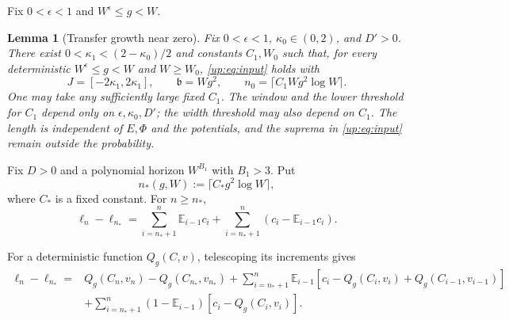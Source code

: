 \documentclass[11pt]{article}
\numberwithin{equation}{section}
\newtheorem{lemma}[theorem]{Lemma}
\theoremstyle{remark}
\newcommand{\E}{\mathbb E}
\begin{document}
Fix $0<\epsilon<1$ and $W^\epsilon\le g<W$.

\begin{lemma}[Transfer growth near zero]\label{up:lem:center-transfer}
Fix $0<\epsilon<1$, $\kappa_0\in(0,2)$, and $D'>0$. There exist $0<\kappa_1<(2-\kappa_0)/2$ and constants
$C_1,W_0$ such that, for every deterministic
$W^\epsilon\le g<W$ and $W\ge W_0$,
\eqref{up:eq:input} holds with
\[
 J=[-2\kappa_1,2\kappa_1],\qquad \mathfrak b=Wg^2,\qquad
 n_0=\lceil C_1Wg^2\log W\rceil.
\]
One may take any sufficiently large fixed $C_1$.
The window and the lower threshold for $C_1$ depend only on
$\epsilon,\kappa_0,D'$; the width threshold may also depend on $C_1$.
The length is independent of $E,\Phi$
and the potentials, and the suprema in \eqref{up:eq:input} remain
outside the probability.
\end{lemma}

Fix $D>0$ and a polynomial horizon $W^{B_1}$ with $B_1>3$.
Put
\begin{equation}\label{lg:eq:initial-time}
 n_*(g,W):=\lceil C_*g^2\log W\rceil,
\end{equation}
where $C_*$ is a fixed constant. For $n\ge n_*$,
\begin{equation}\label{lg:eq:drift-sum}
 \ell_n-\ell_{n_*}=\sum_{i=n_*+1}^n\E_{i-1}c_i
       +\sum_{i=n_*+1}^n(c_i-\E_{i-1}c_i).
\end{equation}

For a deterministic function $Q_g(C,v)$, telescoping its increments gives
\begin{equation}\label{lg:eq:corrected-growth}
 \begin{aligned}
 \ell_n-\ell_{n_*}={}&Q_g(C_n,v_n)-Q_g(C_{n_*},v_{n_*}) +\sum_{i=n_*+1}^n\E_{i-1}
       [c_i-Q_g(C_i,v_i)+Q_g(C_{i-1},v_{i-1})]\\
 &+\sum_{i=n_*+1}^n(1-\E_{i-1})
       [c_i-Q_g(C_i,v_i)].
 \end{aligned}
\end{equation}
\end{document}

